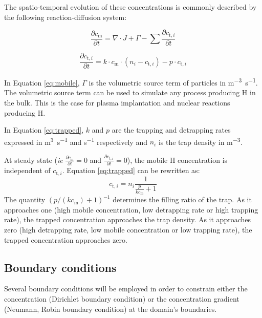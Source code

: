 The spatio-temporal evolution of these concentrations is commonly described by the following reaction-diffusion system:

\begin{equation}
    \frac{\partial c_\mathrm{m}}{\partial t}=\nabla \cdot J+\Gamma-\sum \frac{\partial c_{\mathrm{t}, i}}{\partial t}
    \label{eq:mobile}
\end{equation}

\begin{equation}
    \frac{\partial c_{\mathrm{t}, i}}{\partial t}=k \cdot c_\mathrm{m} \cdot\left(n_{i}-c_{\mathrm{t}, i}\right)-p \cdot c_{\mathrm{t}, i}
    \label{eq:trapped}
\end{equation}

In Equation \ref{eq:mobile}, $\Gamma$ is the volumetric source term of particles in \si{m^{-3}.s^{-1}}.
The volumetric source term can be used to simulate any process producing H in the bulk.
This is the case for plasma implantation and nuclear reactions producing H.

In Equation \ref{eq:trapped}, $k$ and $p$ are the trapping and detrapping rates expressed in \si{m^3.s^{-1}} and \si{s^{-1}} respectively and $n_i$ is the trap density in \si{m^{-3}}.

At steady state (\textit{ie} $\frac{\partial c_\mathrm{m}}{\partial t} = 0$ and $\frac{\partial c_{\mathrm{t}, i}}{\partial t} = 0$), the mobile H concentration is independent of $c_{\mathrm{t}, i}$.
Equation \ref{eq:trapped} can be rewritten as:
\begin{equation}
    c_{\mathrm{t}, i} = n_i \frac{1}{\frac{p}{k c_\mathrm{m}} + 1}
    \label{eq: steady state ct}
\end{equation}
The quantity $(p / (k c_\mathrm{m}) + 1)^{-1}$ determines the filling ratio of the trap. 
As it approaches one (high mobile concentration, low detrapping rate or high trapping rate), the trapped concentration approaches the trap density.
As it approaches zero (high detrapping rate, low mobile concentration or low trapping rate), the trapped concentration approaches zero.

\subsection{Boundary conditions}

Several boundary conditions will be employed in order to constrain either the concentration (Dirichlet boundary condition) or the concentration gradient (Neumann, Robin boundary condition) at the domain's boundaries.


